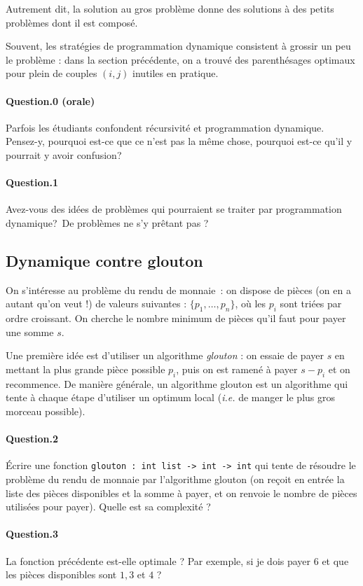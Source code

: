 \documentclass[10pt,a4paper]{article}
\begin{document}
Autrement dit, la solution au gros problème donne des solutions à des petits
problèmes dont il est composé.

Souvent, les stratégies de programmation dynamique consistent à grossir un peu 
le problème : dans la section précédente, on a trouvé des parenthésages optimaux
pour plein de couples $(i,j)$ inutiles en pratique.

\paragraph{Question.0 (orale)} Parfois les étudiants confondent récursivité et
programmation dynamique. Pensez-y, pourquoi est-ce que ce n'est pas la
même chose, pourquoi est-ce qu'il y pourrait y avoir confusion?

\paragraph{Question.1} Avez-vous des idées de problèmes qui pourraient se 
traiter par programmation dynamique? De problèmes ne s'y prêtant pas ?

\subsection{Dynamique contre glouton}
On s'intéresse au problème du rendu de monnaie~: on dispose de pièces
(on en a autant qu'on veut !) de valeurs suivantes : $\{p_1,\dots,p_n\}$, où les
$p_i$ sont triées par ordre croissant. On cherche le nombre minimum de 
pièces qu'il faut pour payer une somme $s$.

Une première idée est d'utiliser un algorithme \textit{glouton} : on essaie de
payer $s$ en mettant la plus grande pièce possible $p_i$, puis on est ramené à
payer $s-p_i$ et on recommence. De manière générale, un algorithme glouton est
un algorithme qui tente à chaque étape d'utiliser un optimum local (\textit{i.e.}
de manger le plus gros morceau possible).

\paragraph{Question.2} Écrire une fonction \texttt{glouton : int list -> int -> int}
qui tente de résoudre le problème du rendu de monnaie par l'algorithme glouton
(on reçoit en entrée la liste des pièces disponibles et la somme à payer, et on 
renvoie le nombre de pièces utilisées pour payer).
Quelle est sa complexité ?
\paragraph{Question.3} La fonction précédente est-elle optimale ? Par exemple,
si je dois payer $6$ et que les pièces disponibles sont $1,3$ et $4$ ?
\end{document}
